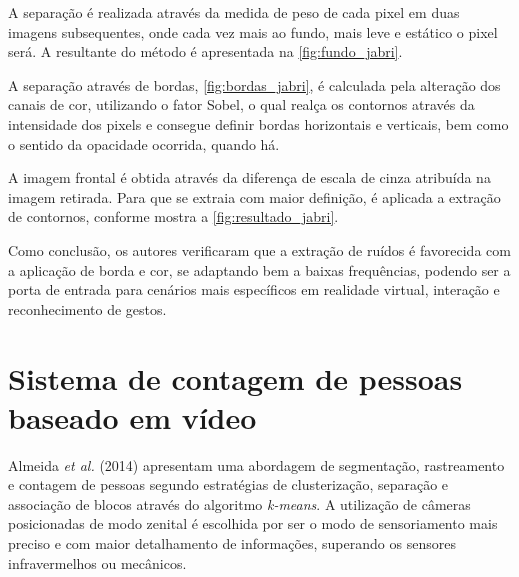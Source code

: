 \documentclass[12pt,oneside,a4paper,chapter=TITLE,section=TITLE,sumario=tradicional]{abntex2}
\begin{document}
A separação é realizada através da medida de peso de cada pixel em duas imagens subsequentes, onde cada vez mais ao fundo, mais leve e estático o pixel será. A resultante do método é apresentada na \autoref{fig:fundo_jabri}.

\begin{figure}[htb]
\end{figure}

A separação através de bordas, \autoref{fig:bordas_jabri}, é calculada pela alteração dos canais de cor, utilizando o fator Sobel, o qual realça os contornos através da intensidade dos pixels e consegue definir bordas horizontais e verticais, bem como o sentido da opacidade ocorrida, quando há.

\begin{figure}[htb]
\end{figure}

A imagem frontal é obtida através da diferença de escala de cinza atribuída na imagem retirada. Para que se extraia com maior definição, é aplicada a extração de contornos, conforme mostra a \autoref{fig:resultado_jabri}.

\begin{figure}[htb]
\end{figure}

Como conclusão, os autores verificaram que a extração de ruídos é favorecida com a aplicação de borda e cor, se adaptando bem a baixas frequências, podendo ser a porta de entrada para cenários mais específicos em realidade virtual, interação e reconhecimento de gestos.

\section{Sistema de contagem de pessoas baseado em vídeo}

Almeida \textit{et al.} (2014) apresentam uma abordagem de segmentação, rastreamento e contagem de pessoas segundo estratégias de clusterização, separação e associação de blocos através do algoritmo \textit{k-means}. A utilização de câmeras posicionadas de modo zenital é escolhida por ser o modo de sensoriamento mais preciso e com maior detalhamento de informações, superando os sensores infravermelhos ou mecânicos.
\end{document}
